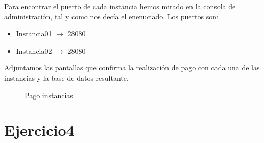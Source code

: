 \documentclass[a4paper, 10pt]{article}
\begin{document}
Para encontrar el puerto de cada instancia hemos mirado en la consola de administración, tal y como nos decía el enenuciado. Los puertos son:
\begin{itemize}
	\item Instancia01 $\rightarrow$ 28080
	\item Instancia02 $\rightarrow$ 28080
\end{itemize}

Adjuntamos las pantallas que confirma la realización de pago con cada una de las instancias y la base de datos resultante.

\begin{figure}[htbp]
	\centering
	\caption{Pago instancias}
\end{figure}
\newpage
\section{Ejercicio4}
\end{document}
